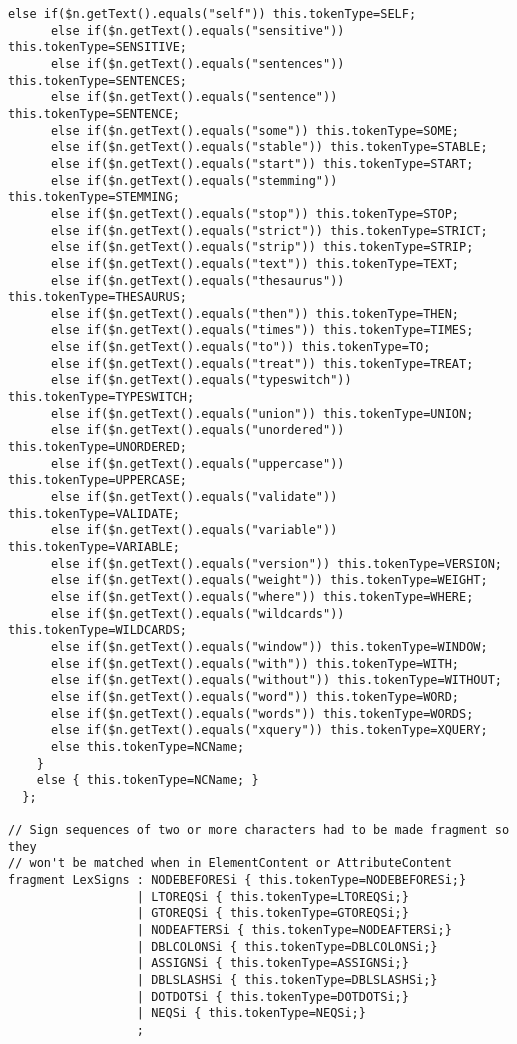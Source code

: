 \begin{Verbatim}[frame=none, fontsize=\footnotesize]
      else if($n.getText().equals("self")) this.tokenType=SELF;
      else if($n.getText().equals("sensitive")) this.tokenType=SENSITIVE;
      else if($n.getText().equals("sentences")) this.tokenType=SENTENCES;
      else if($n.getText().equals("sentence")) this.tokenType=SENTENCE;
      else if($n.getText().equals("some")) this.tokenType=SOME;
      else if($n.getText().equals("stable")) this.tokenType=STABLE;
      else if($n.getText().equals("start")) this.tokenType=START;
      else if($n.getText().equals("stemming")) this.tokenType=STEMMING;
      else if($n.getText().equals("stop")) this.tokenType=STOP;
      else if($n.getText().equals("strict")) this.tokenType=STRICT;
      else if($n.getText().equals("strip")) this.tokenType=STRIP;
      else if($n.getText().equals("text")) this.tokenType=TEXT;
      else if($n.getText().equals("thesaurus")) this.tokenType=THESAURUS;
      else if($n.getText().equals("then")) this.tokenType=THEN;
      else if($n.getText().equals("times")) this.tokenType=TIMES;
      else if($n.getText().equals("to")) this.tokenType=TO;
      else if($n.getText().equals("treat")) this.tokenType=TREAT;
      else if($n.getText().equals("typeswitch")) this.tokenType=TYPESWITCH;
      else if($n.getText().equals("union")) this.tokenType=UNION;
      else if($n.getText().equals("unordered")) this.tokenType=UNORDERED;
      else if($n.getText().equals("uppercase")) this.tokenType=UPPERCASE;
      else if($n.getText().equals("validate")) this.tokenType=VALIDATE;
      else if($n.getText().equals("variable")) this.tokenType=VARIABLE;
      else if($n.getText().equals("version")) this.tokenType=VERSION;
      else if($n.getText().equals("weight")) this.tokenType=WEIGHT;
      else if($n.getText().equals("where")) this.tokenType=WHERE;
      else if($n.getText().equals("wildcards")) this.tokenType=WILDCARDS;
      else if($n.getText().equals("window")) this.tokenType=WINDOW;
      else if($n.getText().equals("with")) this.tokenType=WITH;
      else if($n.getText().equals("without")) this.tokenType=WITHOUT;
      else if($n.getText().equals("word")) this.tokenType=WORD;
      else if($n.getText().equals("words")) this.tokenType=WORDS;
      else if($n.getText().equals("xquery")) this.tokenType=XQUERY;
      else this.tokenType=NCName;
    }
    else { this.tokenType=NCName; }
  };
            
// Sign sequences of two or more characters had to be made fragment so they 
// won't be matched when in ElementContent or AttributeContent            
fragment LexSigns : NODEBEFORESi { this.tokenType=NODEBEFORESi;}       
                  | LTOREQSi { this.tokenType=LTOREQSi;}         
                  | GTOREQSi { this.tokenType=GTOREQSi;}         
                  | NODEAFTERSi { this.tokenType=NODEAFTERSi;}       
                  | DBLCOLONSi { this.tokenType=DBLCOLONSi;}       
                  | ASSIGNSi { this.tokenType=ASSIGNSi;}        
                  | DBLSLASHSi { this.tokenType=DBLSLASHSi;}                 
                  | DOTDOTSi { this.tokenType=DOTDOTSi;}        
                  | NEQSi { this.tokenType=NEQSi;}        
                  ;


\end{Verbatim}
